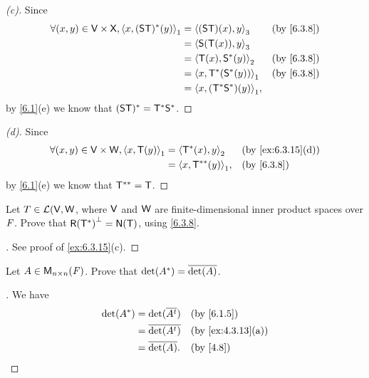 \begin{proof}[(c)]
  Since
  \begin{align*}
    \forall (x, y) \in \V \times \vs{X}, \inn{x, (\lt{S} \T)^*(y)}_1 & = \inn{(\lt{S} \T)(x), y}_3      &  & \text{(by \cref{6.3.8})} \\
                                                                     & = \inn{\lt{S}(\T(x)), y}_3                                     \\
                                                                     & = \inn{\T(x), \lt{S}^*(y)}_2     &  & \text{(by \cref{6.3.8})} \\
                                                                     & = \inn{x, \T^*(\lt{S}^*(y))}_1   &  & \text{(by \cref{6.3.8})} \\
                                                                     & = \inn{x, (\T^* \lt{S}^*)(y)}_1,
  \end{align*}
  by \cref{6.1}(e) we know that \((\mathsf{S} \mathsf{T})^* = \mathsf{T}^* \mathsf{S}^*\).
\end{proof}

\begin{proof}[(d)]
  Since
  \begin{align*}
    \forall (x, y) \in \V \times \W, \inn{x, \T(y)}_1 & = \inn{\T^*(x), y}_2     &  & \text{(by \cref{ex:6.3.15}(d))} \\
                                                      & = \inn{x, \T^{**}(y)}_1, &  & \text{(by \cref{6.3.8})}
  \end{align*}
  by \cref{6.1}(e) we know that \(\mathsf{T}^{**} = \mathsf{T}\).
\end{proof}

\begin{ex}\label{ex:6.3.17}
  Let \(T \in \mathcal{L}(\mathsf{V}, \mathsf{W}\), where \(\mathsf{V}\) and \(\mathsf{W}\) are finite-dimensional inner product spaces over \(\mathit{F}\).
  Prove that \(\rg{\T^*}^{\perp} = \ns{\T}\), using \cref{6.3.8}.
\end{ex}

\begin{proof}[]
  See proof of \cref{ex:6.3.15}(c).
\end{proof}

\begin{ex}\label{ex:6.3.18}
  Let \(A \in \mathsf{M}_{{n} \times n}({\mathit{F}})\).
  Prove that \(\det(A^*) = \overline{\det(A)}\).
\end{ex}

\begin{proof}[]
  We have
  \begin{align*}
    \det(A^*) & = \det(\conj{\tp{A}}) &  & \text{(by \cref{6.1.5})}        \\
              & = \conj{\det(\tp{A})} &  & \text{(by \cref{ex:4.3.13}(a))} \\
              & = \conj{\det(A)}.     &  & \text{(by \cref{4.8})}
  \end{align*}
\end{proof}

